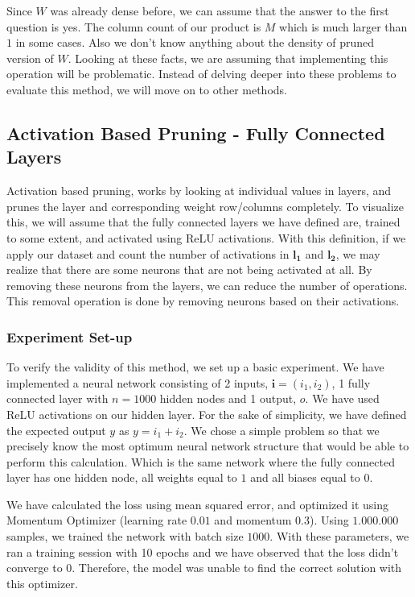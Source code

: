 Since $W$ was already dense before, we can assume that the answer to the first question is yes. The column count of our product is $M$ which is much larger than $1$ in some cases. Also we don't know anything about the density of pruned version of $W$. Looking at these facts, we are assuming that implementing this operation will be problematic. Instead of delving deeper into these problems to evaluate this method, we will move on to other methods.

\subsection{Activation Based Pruning - Fully Connected Layers} \label{sec:activation-based-pruning-convolution}
Activation based pruning, works by looking at individual values in layers, and prunes the layer and corresponding weight row/columns completely. To visualize this, we will assume that the fully connected layers we have defined are, trained to some extent, and activated using ReLU activations. With this definition, if we apply our dataset and count the number of activations in $\mathbf{l_1}$ and $\mathbf{l_2}$, we may realize that there are some neurons that are not being activated at all. By removing these neurons from the layers, we can reduce the number of operations. This removal operation is done by removing neurons based on their activations. 

\subsubsection{Experiment Set-up}
To verify the validity of this method, we set up a basic experiment. We have implemented a neural network consisting of 2 inputs, $\mathbf{i} = (i_1, i_2)$, 1 fully connected layer with $n = 1000$ hidden nodes and 1 output, $o$. We have used ReLU \cite{nair2010rectified} activations on our hidden layer. For the sake of simplicity, we have defined the expected output $y$ as $y = i_1 + i_2$. We chose a simple problem so that we precisely know the most optimum neural network structure that would be able to perform this calculation. Which is the same network where the fully connected layer has one hidden node, all weights equal to $1$ and all biases equal to $0$.

We have calculated the loss using mean squared error, and optimized it using Momentum Optimizer (learning rate $0.01$ and momentum $0.3$). Using $1.000.000$ samples, we trained the network with batch size $1000$. With these parameters, we ran a training session with 10 epochs and we have observed that the loss didn't converge to 0. Therefore, the model was unable to find the correct solution with this optimizer. 
